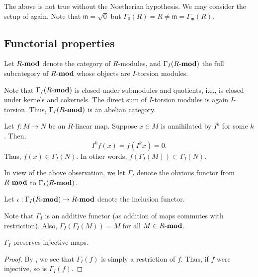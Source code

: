 \begin{ex}
	The above is not true without the Noetherian hypothesis. We may consider the setup of  again. Note that $\mathfrak{m} = \sqrt{0}$ but $\Gamma_{0}(R) = R \neq \mathfrak{m} = \Gamma_{\mathfrak{m}}(R)$.
\end{ex}

\subsection{Functorial properties}

Let $R\text{-}\mathbf{mod}$ denote the category of $R$-modules, and $\Gamma_{I}(R\text{-}\mathbf{mod})$ the full subcategory of $R\text{-}\mathbf{mod}$ whose objects are $I$-torsion modules. 

\begin{obs} \label{obs:GIR-closed-subquotients}
	Note that $\Gamma_{I}(R\text{-}\mathbf{mod})$ is closed under submodules and quotients, i.e., is closed under kernels and cokernels. The direct sum of $I$-torsion modules is again $I$-torsion. Thus, $\Gamma_{I}(R\text{-}\mathbf{mod})$ is an abelian category.
\end{obs}

\begin{obs} \label{obs:Gamma-I-restricts}
	Let $f : M \to N$ be an $R$-linear map. Suppose $x \in M$ is annihilated by $I^{k}$ for some $k$. Then,
	\begin{equation*} 
		I^{k} f(x) = f(I^{k} x) = 0.
	\end{equation*}
	Thus, $f(x) \in \Gamma_{I}(N)$. In other words, $f(\Gamma_{I}(M)) \subset \Gamma_{I}(N)$.
\end{obs}

\begin{defn}
	In view of the above observation, we let $\Gamma_{I}$ denote the obvious functor from $R\text{-}\mathbf{mod}$ to $\Gamma_{I}(R\text{-}\mathbf{mod})$.

	Let $\iota : \Gamma_{I}(R\text{-}\mathbf{mod}) \to R\text{-}\mathbf{mod}$ denote the inclusion functor.
\end{defn}

\begin{obs}
	Note that $\Gamma_{I}$ is an additive functor (as addition of maps commutes with restriction). \newline
	Also, $\Gamma_{I}(\Gamma_{I}(M)) = M$ for all $M \in R\text{-}\mathbf{mod}$.  
\end{obs}

\begin{prop} \label{prop:Gamma-preserves-injective-maps}
	$\Gamma_{I}$ preserves injective maps.
\end{prop}
\begin{proof} 
	By , we see that $\Gamma_{I}(f)$ is simply a restriction of $f$. Thus, if $f$ were injective, so is $\Gamma_{I}(f)$.
\end{proof}

